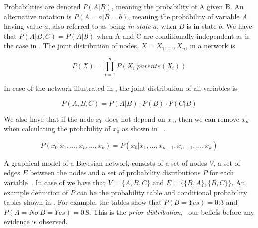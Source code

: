 Probabilities are denoted $P(A|B)$, meaning the probability of A given B. An alternative notation is $P(A=a|B=b)$, meaning the probability of variable $A$ having value $a$, also referred to as being \emph{in state} $a$, when $B$ is in state $b$. We have that $P(A|B,C) = P(A|B)$ when A and C are conditionally independent as is the case in . The joint distribution of nodes, $X = X_1,\ldots,X_n$, in a network is

\begin{equation}
\label{eq:analysis:bayesian-network:prod}
P(X) = \displaystyle \prod_{i=1}^{n} P(X_i|parents(X_i))
\end{equation}

In case of the network illustrated in , the joint distribution of all variables is

\begin{equation}
P(A, B, C) = P(A|B) \cdot P(B) \cdot P(C|B)
\end{equation}

We also have that if the node $x_0$ does not depend on $x_n$, then we can remove $x_n$ when calculating the probability of $x_0$ as shown in ~\cite{stephenson2000introduction}.

\begin{equation}
\label{eq:analysis:bayesian-network:not-child}
P(x_0|x_1,\ldots,x_n,\ldots,x_k) = P(x_0|x_1,\ldots,x_{n-1},x_{n+1},\ldots,x_k)
\end{equation}

A graphical model of a Bayesian network consists of a set of nodes $V$, a set of edges $E$ between the nodes and a set of probability distributions $P$ for each variable~\cite{stephenson2000introduction}. In case of  we have that $V = \{A, B, C\}$ and $E = \{\{B, A\}, \{B,C\}\}$. An example definition of $P$ can be the probability table and conditional probability tables shown in . For example, the tables show that $P(B=Yes) = 0.3$ and $P(A=No|B=Yes) = 0.8$. This is the \emph{prior distribution}, \ie~our beliefs before any evidence is observed.

